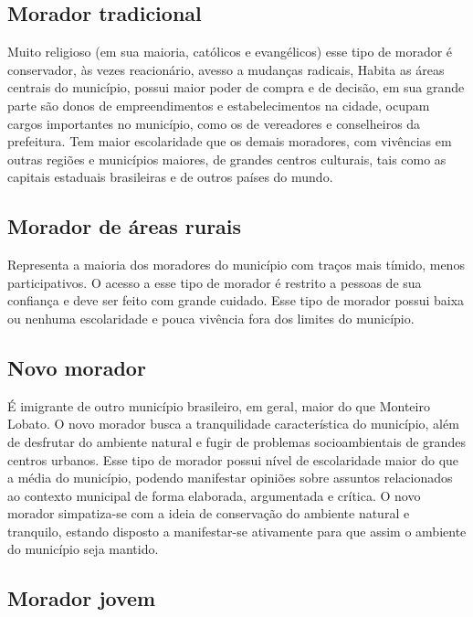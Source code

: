 \subsection{Morador tradicional}

Muito religioso (em sua maioria, católicos e evangélicos) esse tipo de morador é conservador, às vezes reacionário, avesso a mudanças radicais, 
Habita as áreas centrais do município, possui maior poder de compra e de decisão, em sua grande parte são donos de empreendimentos e estabelecimentos na cidade, ocupam cargos importantes no município, como os de vereadores e conselheiros da prefeitura. Tem maior escolaridade que os demais moradores, com vivências em outras regiões e municípios maiores, de grandes centros culturais, tais como as capitais estaduais brasileiras e de outros países do mundo.

\subsection{Morador de áreas rurais}

Representa a maioria dos moradores do município com traços mais tímido, menos participativos. O acesso a esse tipo de morador é restrito a pessoas de sua confiança e deve ser feito com grande cuidado. Esse tipo de morador possui baixa ou nenhuma escolaridade e pouca vivência fora dos limites do município.

\subsection{Novo morador}

É imigrante de outro município brasileiro, em geral, maior do que Monteiro Lobato.  O novo morador busca a tranquilidade característica do município, além de desfrutar do ambiente natural e fugir de problemas socioambientais de grandes centros urbanos. Esse tipo de morador possui nível de escolaridade maior do que a média do município, podendo manifestar opiniões sobre assuntos relacionados ao contexto municipal de forma elaborada, argumentada e crítica. O novo morador simpatiza-se com a ideia de conservação do ambiente natural e tranquilo, estando disposto a manifestar-se ativamente para que assim o ambiente do município seja mantido.

\subsection{Morador jovem}


